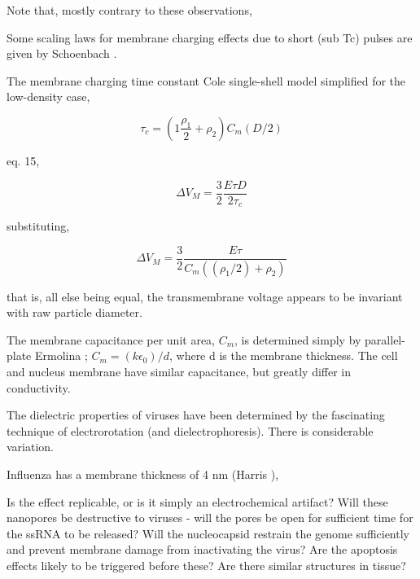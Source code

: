 \documentclass[paper.tex]{subfiles}
\begin{document}
Note that, mostly contrary to these observations, 


\cite{Nanosecond2006b} 











Some scaling laws for membrane charging effects due to short (sub Tc) pulses are given by Schoenbach \cite{Bioelectric2007}. 

The membrane charging time constant Cole single-shell model \cite{Ultrashort2004} simplified for the low-density case, 

$$\tau_c = \left(1 \frac{\rho_1}{2} + \rho_2\right) C_m (D/2)$$

\cite{Bioelectric2007} eq. 15, 

$$\Delta V_M = \frac{3}{2}\frac{E\tau D}{2 \tau_c }$$

substituting,

$$\Delta V_M = \frac{3}{2}\frac{E \tau}{C_m ((\rho_1/2) + \rho_2)}$$

that is, all else being equal, the transmembrane voltage appears to be invariant with raw particle diameter.

The membrane capacitance per unit area, $C_m$, is determined simply by parallel-plate Ermolina \cite{Study2001}; $C_m = (k\epsilon_0) / d$, where d is the membrane thickness. The cell and nucleus membrane have similar capacitance, but greatly differ in conductivity.



The dielectric properties of viruses have been determined by the fascinating technique of electrorotation (and dielectrophoresis). There is considerable variation.


Influenza has a membrane thickness of 4 nm (Harris \cite{Influenza2006}), 
















Is the effect replicable, or is it simply an electrochemical artifact? Will these nanopores be destructive to viruses - will the pores be open for sufficient time for the ssRNA to be released? Will the nucleocapsid restrain the genome sufficiently and prevent membrane damage from inactivating the virus? Are the apoptosis effects likely to be triggered before these? Are there similar structures in tissue?
\end{document}
